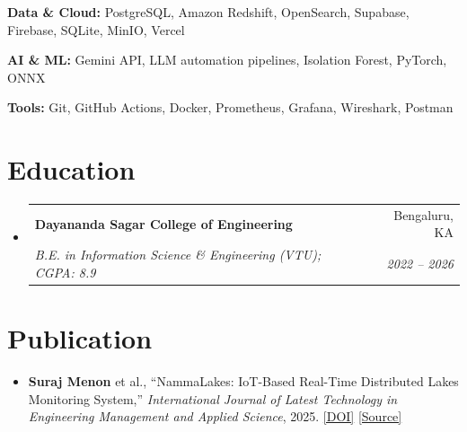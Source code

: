 \documentclass[a4paper,10pt]{article}
\makeatletter
\newcommand{\resumeItem}[1]{
  \item\small{
    {#1}\vspace{0pt}
  }
}
\newcommand{\resumeSubheading}[4]{
  \vspace{-2pt}\item
    \begin{tabular*}{0.97\textwidth}{l@{\extracolsep{\fill}}r}
      \textbf{#1} & #2 \\
      \textit{\small#3} & \textit{\small #4} \\
    \end{tabular*}\vspace{-1pt}
}
\newcommand{\resumeSubHeadingListStart}{\begin{itemize}[leftmargin=*, itemsep=0.5pt, parsep=0pt, topsep=1pt, partopsep=0pt]}
\newcommand{\resumeSubHeadingListEnd}{\end{itemize}}
\makeatother
\begin{document}
\textbf{Data \& Cloud:} PostgreSQL, Amazon Redshift, OpenSearch, Supabase, Firebase, SQLite, MinIO, Vercel

\textbf{AI \& ML:} Gemini API, LLM automation pipelines, Isolation Forest, PyTorch, ONNX

\textbf{Tools:} Git, GitHub Actions, Docker, Prometheus, Grafana, Wireshark, Postman


\section{Education}
  \resumeSubHeadingListStart
    \resumeSubheading
      {Dayananda Sagar College of Engineering}{Bengaluru, KA}
      {B.E. in Information Science \& Engineering (VTU);  CGPA: 8.9}{2022 -- 2026}
  \resumeSubHeadingListEnd

\section{Publication}
\resumeSubHeadingListStart
\resumeItem{\textbf{Suraj Menon} et al., ``NammaLakes: IoT-Based Real-Time Distributed Lakes Monitoring System,'' \textit{International Journal of Latest Technology in Engineering Management and Applied Science}, 2025. \href{https://doi.org/10.51583/IJLTEMAS.2025.1409000060}{[DOI]} \href{https://github.com/NammaLakes}{[Source]}}
\resumeSubHeadingListEnd
\end{document}
